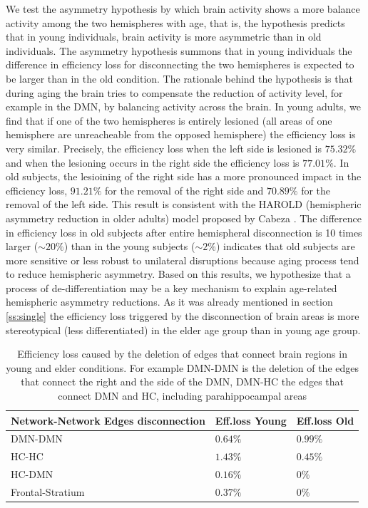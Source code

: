 \documentclass[12pt,a4paper]{article}
\begin{document}
We test the asymmetry hypothesis by which brain activity shows a more balance activity among the two hemispheres with age, that is, the hypothesis predicts that in young individuals, brain activity is more asymmetric than in old individuals. The asymmetry hypothesis summons that in young individuals the difference in efficiency loss for disconnecting the two hemispheres is expected to be larger than in the old condition. The rationale behind the hypothesis is that during aging the brain tries to compensate the reduction of activity level, for example in the DMN, by balancing activity across the brain. 
In young adults, we find that if one of the two hemispheres is entirely lesioned (all areas of one hemisphere are unreacheable from the opposed hemisphere) the efficiency loss is very similar. Precisely, the efficiency loss  when the left side is lesioned is $75.32\%$ and when the lesioning occurs in the right side the efficiency loss is $77.01\%$. 
In old subjects, the lesioining of the right side has a more pronounced impact in the efficiency loss, $91.21\%$ for the removal of the right side and $70.89\%$ for the removal of the left side. 
This result is consistent with the HAROLD (hemispheric asymmetry reduction in older adults) model proposed by  
Cabeza \cite{cabeza_aging_2002}. The difference in efficiency loss in old subjects after entire hemispheral disconnection 
is 10 times larger ($\sim 20\%$) than in the young subjects ($\sim 2\%$) indicates that old subjects are more sensitive or less robust to unilateral disruptions because aging process tend to reduce hemispheric asymmetry.
Based on this results, we hypothesize that a process of de-differentiation may be a key mechanism to explain age-related hemispheric asymmetry reductions. As it was already mentioned in section \ref{ss:single}  the efficiency loss triggered by the disconnection of brain areas is more stereotypical (less differentiated) in the elder age group than in young age group.

\begin{table}[!htbp]
\centering%
\caption{Efficiency loss caused by the deletion of edges that connect brain regions in young and elder conditions. For example DMN-DMN is the deletion of the edges that connect the right and the side of the DMN, DMN-HC the edges that connect DMN and HC, including parahippocampal areas}
\begin{tabularx}{\linewidth}{XXX}
\toprule
Network-Network Edges disconnection & Eff.loss Young & Eff.loss Old\\
\midrule
\midrule
DMN-DMN & $0.64\%$& $0.99\%$\\
\midrule
HC-HC & $1.43\%$& $0.45\%$\\
\midrule
HC-DMN & $0.16\%$& $0\%$\\
\midrule
Frontal-Stratium & $0.37\%$& $0\%$\\
\bottomrule
\end{tabularx}
\label{tab:edges}
\end{table}
\end{document}
